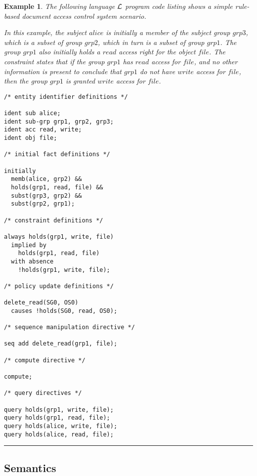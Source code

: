 \documentclass[10pt, twocolumn]{article}
\newtheorem{examp}{Example}
\newenvironment{example}{\begin{examp}\rm}{\rule{2mm}{2mm}\end{examp}}
\begin{document}
        \begin{example}
          \label{ex-1}
          The following language ${\cal L}$ program code listing shows a simple
          rule-based document access control system scenario.

          In this example, the subject $alice$ is initially a member of the
          subject group $grp3$, which is a subset of group $grp2$, which in
          turn is a subset of group $grp1$. The group $grp1$ also initially
          holds a $read$ access right for the object $file$. The constraint
          states that if the group $grp1$ has $read$ access for $file$, and no
          other information is present to conclude that $grp1$ do not have
          $write$ access for $file$, then the group $grp1$ is granted $write$
          access for $file$.

          \begin{verbatim}
/* entity identifier definitions */

ident sub alice;
ident sub-grp grp1, grp2, grp3;
ident acc read, write;
ident obj file;

/* initial fact definitions */

initially
  memb(alice, grp2) &&
  holds(grp1, read, file) &&
  subst(grp3, grp2) &&
  subst(grp2, grp1);

/* constraint definitions */

always holds(grp1, write, file)
  implied by
    holds(grp1, read, file)
  with absence
    !holds(grp1, write, file);

/* policy update definitions */

delete_read(SG0, OS0)
  causes !holds(SG0, read, OS0);

/* sequence manipulation directive */

seq add delete_read(grp1, file);

/* compute directive */

compute;

/* query directives */

query holds(grp1, write, file);
query holds(grp1, read, file);
query holds(alice, write, file);
query holds(alice, read, file);
          \end{verbatim}
        \end{example}

    \subsection{Semantics}
\end{document}
